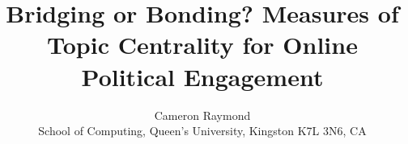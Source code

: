 
\newcommand{\specialcell}[2][c]{\begin{oldtabular}[#1]{@{}l@{}}#2\end{oldtabular}}


\documentclass{nws}

\providecommand\AMSLaTeX{AMS\,\LaTeX}
\newcommand\eg{\emph{e.g.}\ }
\newcommand\etc{\emph{etc.}}
\newcommand\bcmdtab{\noindent\bgroup\tabcolsep=0pt%
  \begin{tabular}{@{}p{10pc}@{}p{20pc}@{}}}
\newcommand\ecmdtab{\end{tabular}\egroup}
\newcommand\rch[1]{$\longrightarrow\rlap{$#1$}$\hspace{1em}}
\newcommand\lra{\ensuremath{\qquad\longrightarrow\qquad}}

\title[Bridging or Bonding? Measures of Topic Centrality for Online Political Engagement]
      {Bridging or Bonding? Measures of Topic Centrality for Online Political Engagement}

 \author[C.J.K Raymond]
        {Cameron Raymond\\
        School of Computing, Queen's University, Kingston K7L 3N6, CA\\
         }

\pagerange{\pageref{firstpage}--\pageref{lastpage}}




\label{firstpage}

\maketitle

